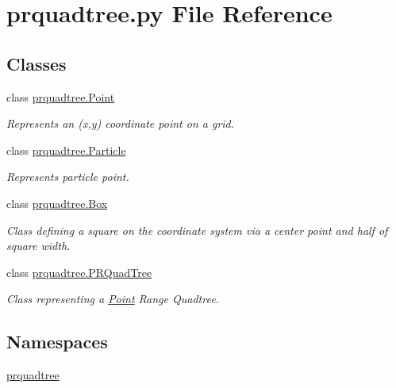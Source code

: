 \section{prquadtree.\+py File Reference}
\label{prquadtree_8py}
\subsection*{Classes}
\begin{DoxyCompactItemize}
\item 
class \hyperlink{classprquadtree_1_1Point}{prquadtree.\+Point}
\begin{DoxyCompactList}\small\item\em Represents an (x,y) coordinate point on a grid. \end{DoxyCompactList}\item 
class \hyperlink{classprquadtree_1_1Particle}{prquadtree.\+Particle}
\begin{DoxyCompactList}\small\item\em Represents particle point. \end{DoxyCompactList}\item 
class \hyperlink{classprquadtree_1_1Box}{prquadtree.\+Box}
\begin{DoxyCompactList}\small\item\em Class defining a square on the coordinate system via a center point and half of square width. \end{DoxyCompactList}\item 
class \hyperlink{classprquadtree_1_1PRQuadTree}{prquadtree.\+P\+R\+Quad\+Tree}
\begin{DoxyCompactList}\small\item\em Class representing a \hyperlink{classprquadtree_1_1Point}{Point} Range Quadtree. \end{DoxyCompactList}\end{DoxyCompactItemize}
\subsection*{Namespaces}
\begin{DoxyCompactItemize}
\item 
 \hyperlink{namespaceprquadtree}{prquadtree}
\end{DoxyCompactItemize}
